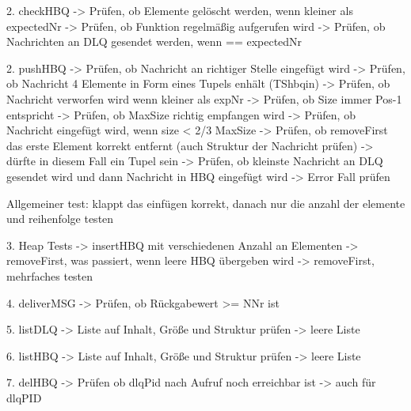2. checkHBQ
-> Prüfen, ob Elemente gelöscht werden, wenn kleiner als expectedNr
-> Prüfen, ob Funktion regelmäßig aufgerufen wird 
-> Prüfen, ob Nachrichten an DLQ gesendet werden, wenn == expectedNr

2. pushHBQ
-> Prüfen, ob Nachricht an richtiger Stelle eingefügt wird 
-> Prüfen, ob Nachricht 4 Elemente in Form eines Tupels enhält (TShbqin)
-> Prüfen, ob Nachricht verworfen wird wenn kleiner als expNr 
-> Prüfen, ob Size immer Pos-1 entspricht 
-> Prüfen, ob MaxSize richtig empfangen wird 
-> Prüfen, ob Nachricht eingefügt wird, wenn size < 2/3 MaxSize
-> Prüfen, ob removeFirst das erste Element korrekt entfernt (auch Struktur der Nachricht prüfen)
    -> dürfte in diesem Fall ein Tupel sein 
-> Prüfen, ob kleinste Nachricht an DLQ gesendet wird und dann Nachricht in HBQ eingefügt wird 
-> Error Fall prüfen


Allgemeiner test: klappt das einfügen korrekt, danach nur die anzahl der elemente und reihenfolge testen 

3. Heap Tests 
-> insertHBQ mit verschiedenen Anzahl an Elementen
-> removeFirst, was passiert, wenn leere HBQ übergeben wird 
-> removeFirst, mehrfaches testen

4. deliverMSG
-> Prüfen, ob Rückgabewert >= NNr ist

5. listDLQ
-> Liste auf Inhalt, Größe und Struktur prüfen
-> leere Liste 

6. listHBQ
-> Liste auf Inhalt, Größe und Struktur prüfen
-> leere Liste 

7. delHBQ
-> Prüfen ob dlqPid nach Aufruf noch erreichbar ist 
-> auch für dlqPID